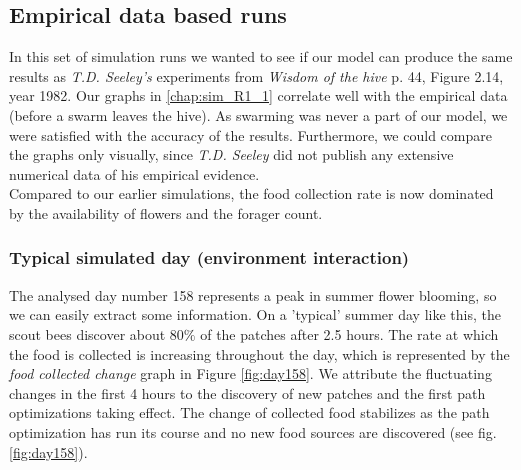 \subsection{Empirical data based runs}
	In this set of simulation runs we wanted to see if our model can produce the same results as \textit{T.D. Seeley's} experiments from \textit{Wisdom of the hive} p. 44, Figure  2.14, year 1982. Our graphs in \ref{chap:sim_R1_1} correlate well with the empirical data (before a swarm leaves the hive). As swarming was never a part of our model, we were satisfied with the accuracy of the results. Furthermore, we could compare the graphs only visually, since \textit{T.D. Seeley} did not publish any  extensive numerical data of his empirical evidence.\\
	Compared to our earlier simulations, the food collection rate is now dominated by the availability of flowers and the forager count.
	
	\subsubsection{Typical simulated day (environment interaction)}
		The analysed day number 158 represents a peak in summer flower blooming, so we can easily extract some information. On a 'typical' summer day like this, the scout bees discover about $80\%$ of the patches after 2.5 hours. The rate at which the food is collected is increasing throughout the day, which is represented by the \textit{food collected change} graph in Figure \ref{fig:day158}. We attribute the fluctuating changes in the first 4 hours to the discovery of new patches and the first path optimizations taking effect. The change of collected food stabilizes as the path optimization has run its course and no new food sources are discovered (see fig. \ref{fig:day158}).\\
		
